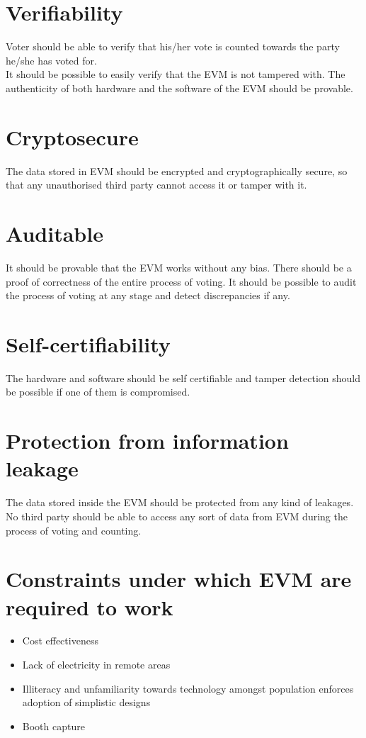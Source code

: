 \documentclass[a4paper,12pt,openany]{book}
\begin{document}
\section{Verifiability}
Voter should be able to verify that his/her vote is counted towards the party he/she has voted for.\\
It should be possible to easily verify that the EVM is not tampered with. The authenticity of both hardware and the software of the EVM should be provable.

\section{Cryptosecure}
The data stored in EVM should be encrypted and cryptographically secure, so that any unauthorised third party cannot access it or tamper with it.

\section{Auditable}
It should be provable that the EVM works without any bias. There should be a proof of correctness of the entire process of voting. It should be possible to audit the process of voting at any stage and detect discrepancies if any.

\section{Self-certifiability}
The hardware and software should be self certifiable and tamper detection should be possible if one of them is compromised.

\section{Protection from information leakage}
The data stored inside the EVM should be protected from any kind of leakages. No third party should be able to access any sort of data from EVM during the process of voting and counting.

\newpage
\section{Constraints under which EVM are required to work}

\begin{itemize}
\item Cost effectiveness
\item Lack of electricity in remote areas
\item Illiteracy and unfamiliarity towards technology amongst population enforces adoption of simplistic designs
\item Booth capture
\end{itemize}
\end{document}
